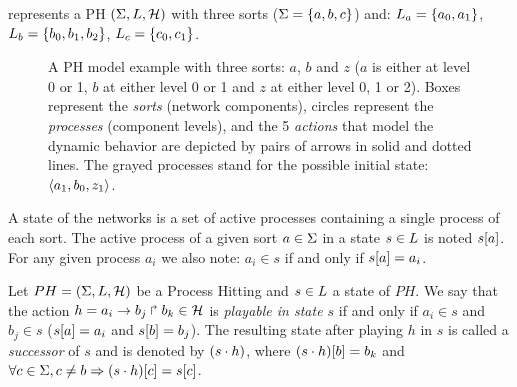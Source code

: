 
\begin{example*}
 represents a PH $(\Sigma,L,\mathcal{H})$ with three sorts
($\Sigma = \{a, b, c\}$) and:
$L_a = \{a_0, a_1\}$,
$L_b = \{b_0, b_1, b_2\}$,
$L_c = \{c_0, c_1\}$.
\begin{figure}[ht]
\centering
{}
\caption{\label{fig:ph} 
A PH model example with three sorts: $a$, $b$ and $z$ ($a$ is either at level 0 or 1, $b$ at either level 0 or 1 and $z$ at either level 0, 1 or 2). Boxes represent the \emph{sorts} (network components), circles represent the \emph{processes} (component levels), and the 5 \emph{actions} that model the dynamic behavior are depicted by pairs of arrows in solid and dotted lines. The grayed processes stand for the possible initial state: $\langle a_1, b_0, z_1 \rangle$.
}
\end{figure}
\end{example*}
A state of the networks is a set of active processes containing a single process of each sort.
The active process of a given sort $a \in \Sigma$ in a state $s \in L$
is noted ${s[a]}$.
For any given process $a_i$ we also note: $a_i \in s$ if and only if ${s[a]} = a_i$.

\begin{definition} 
\label{def:playableAction}
Let $PH = (\Sigma,L,\mathcal{H})$ be a Process Hitting and $s \in L$ a state of $PH$.
We say that the action $h = a_i\rightarrow b_j\Rsh b_k \in \mathcal{H}$
is \emph{playable in state $s$} if and only if
$a_i \in s$ and $b_j \in s$ (\ie ${s[a]} = a_i$ and ${s[b]}=b_j$).
The resulting state after playing $h$ in $s$
is called a \emph{successor} of $s$ and
is denoted by $(s \cdot h)$,
where ${(s \cdot h)[b]} = b_k$ and
$\forall c \in \Sigma, c \neq b \Rightarrow {(s \cdot h)[c]}={s[c]}$.
\end{definition}

